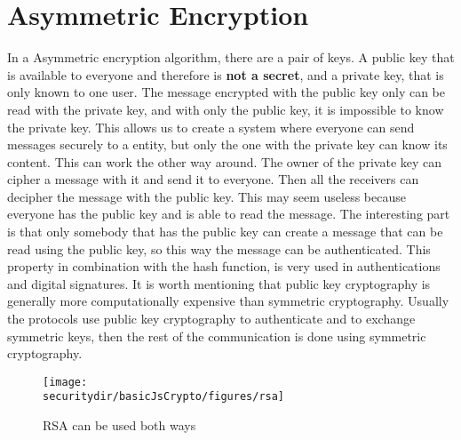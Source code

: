 \section{Asymmetric Encryption}

In a Asymmetric encryption algorithm, there are a pair of keys. A public key that is available to everyone and therefore is \textbf{not a secret}, and a private key, that is only known to one user. The message encrypted with the public key only can be read with the private key, and with only the public key, it is impossible to know the private key. This allows us to create a system where everyone can send messages securely to a entity, but only the one with the private key can know its content.
This can work the other way around. The owner of the private key can cipher a message with it and send it to everyone. Then all the receivers can decipher the message with the public key. This may seem useless because everyone has the public key and is able to read the message. The interesting part is that only somebody that has the public key can create a message that can be read using the public key, so this way the message can be authenticated. This property in combination with the hash function, is very used in authentications and digital signatures. It is worth mentioning that public key cryptography is generally more computationally expensive than symmetric cryptography. Usually the protocols use public key cryptography to authenticate and to exchange symmetric keys, then the rest of the communication is done using symmetric cryptography.
 
\begin{figure}[htb]
	\begin{centering}
		\texttt{[image: \\securitydir/basicJsCrypto/figures/rsa]}
		\par\end{centering}
	\caption{\label{fig:rsa} RSA can be used both ways}
\end{figure}